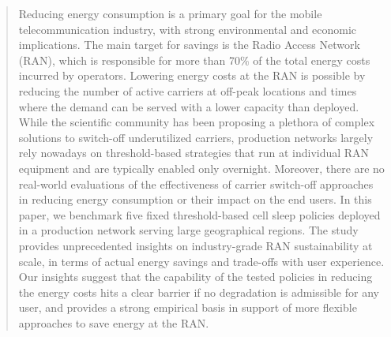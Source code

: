 \documentclass[10pt, conference, letterpaper]{IEEEtran}
\newcommand{\om}[1]{\textcolor{purple}{[Orlando -- #1]}}
\begin{document}
\maketitle

\begin{abstract}

Reducing energy consumption is a primary goal for the mobile telecommunication industry, with strong environmental and economic implications. The main target for savings is the Radio Access Network (RAN), which is responsible for more than 70\% of the total energy costs incurred by operators.
Lowering energy costs at the RAN is possible by reducing the number of active carriers at off-peak locations and times where the demand can be served with a lower capacity than deployed.
While the scientific community has been proposing a plethora of complex solutions to switch-off underutilized carriers, production networks largely rely nowadays on threshold-based strategies that run at individual RAN equipment and are typically enabled only overnight.
Moreover, there are no real-world evaluations of the effectiveness of carrier switch-off approaches in reducing energy consumption or their impact on the end users.
In this paper, we benchmark five %
fixed threshold-based cell sleep policies deployed in a production network serving large geographical regions.
The study provides unprecedented insights on industry-grade RAN sustainability at scale, in terms of actual energy savings and trade-offs with user experience. Our insights suggest that the capability of the tested policies in reducing the energy costs hits a clear barrier if no degradation is admissible for any user, and provides a strong empirical basis in support of more flexible approaches to save energy at the RAN.




\end{abstract}
\end{document}

